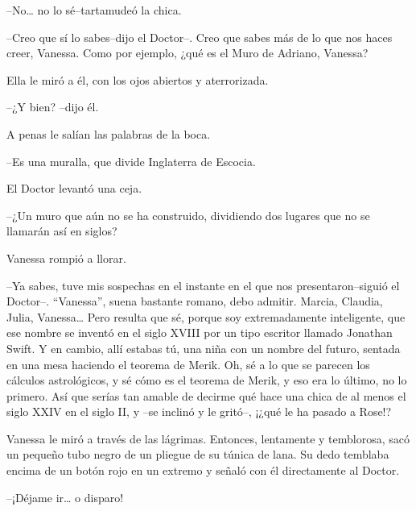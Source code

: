 --No\ldots{} no lo sé--tartamudeó la chica.

--Creo que sí lo sabes--dijo el Doctor--. Creo que sabes más de lo que
nos haces creer, Vanessa. Como por ejemplo, ¿qué es el Muro de Adriano,
Vanessa?

Ella le miró a él, con los ojos abiertos y aterrorizada.

--¿Y bien? --dijo él.

A penas le salían las palabras de la boca.

--Es una muralla, que divide Inglaterra de Escocia.

El Doctor levantó una ceja.

--¿Un muro que aún no se ha construido, dividiendo dos lugares que no se
llamarán así en siglos?

Vanessa rompió a llorar.

--Ya sabes, tuve mis sospechas en el instante en el que nos
presentaron--siguió el Doctor--. ``Vanessa'', suena bastante romano,
debo admitir. Marcia, Claudia, Julia, Vanessa\ldots{} Pero resulta que
sé, porque soy extremadamente inteligente, que ese nombre se inventó en
el siglo XVIII por un tipo escritor llamado Jonathan Swift. Y en cambio,
allí estabas tú, una niña con un nombre del futuro, sentada en una mesa
haciendo el teorema de Merik. Oh, sé a lo que se parecen los cálculos
astrológicos, y sé cómo es el teorema de Merik, y eso era lo último, no
lo primero. Así que serías tan amable de decirme qué hace una chica de
al menos el siglo XXIV en el siglo II, y --se inclinó y le gritó--,
¡¿qué le ha pasado a Rose!?

Vanessa le miró a través de las lágrimas. Entonces, lentamente y
temblorosa, sacó un pequeño tubo negro de un pliegue de su túnica de
lana. Su dedo temblaba encima de un botón rojo en un extremo y señaló
con él directamente al Doctor.

--¡Déjame ir\ldots{} o disparo!